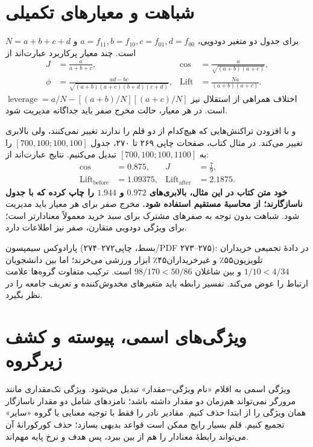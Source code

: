 \documentclass[12pt,a4paper,oneside]{report}
\newcounter{ex}[chapter]
\begin{document}
\section{شباهت و معیارهای تکمیلی}

برای جدول دو متغیر دودویی، $a=f_{11},b=f_{10},c=f_{01},d=f_{00}$ و $N=a+b+c+d$ است. چند معیار پرکاربرد عبارت‌اند از
\begin{align*}
J&=\frac a{a+b+c},&\operatorname{cos}&=\frac a{\sqrt{(a+b)(a+c)}},\\
\phi&=\frac{ad-bc}{\sqrt{(a+b)(a+c)(b+d)(c+d)}},&\operatorname{Lift}&=\frac{Na}{(a+b)(a+c)}.
\end{align*}
اختلاف همراهی از استقلال نیز $\operatorname{leverage}=a/N-[(a+b)/N][(a+c)/N]$ است. در هر معیار، حالت مخرج صفر باید جداگانه مدیریت شود.

 و  با افزودن تراکنش‌هایی که هیچ‌کدام از دو قلم را ندارند تغییر نمی‌کنند، ولی بالابری تغییر می‌کند. در مثال کتاب، صفحات چاپی ۲۶۹ تا ۲۷۰، جدول $[700,100;100,100]$ را به $[700,100;100,1100]$ تبدیل می‌کنیم. نتایج عبارت‌اند از:
\begin{align*}
\operatorname{cos}&=0.875,& J&=\frac79,\\
\operatorname{Lift}_{\mathrm{before}}&=1.09375,&
\operatorname{Lift}_{\mathrm{after}}&=2.1875.
\end{align*}
\textbf{خود متن کتاب در این مثال، بالابری‌های $0.972$ و $1.944$ را چاپ کرده که با جدول ناسازگارند؛ از محاسبهٔ مستقیم استفاده شود.} مخرج صفر برای هر معیار باید مدیریت شود. شباهت بدون توجه به صفرهای مشترک برای سبد خرید معمولاً معنادارتر است؛ برای ویژگی دودویی متقارن، صفر نیز اطلاعات دارد.

پارادوکس سیمپسون (بسط، چاپی۲۷۲--۲۷۴/PDF ۲۷۳--۲۷۵): در دادهٔ تجمیعی خریداران تلویزیون۵۵٪ و غیرخریداران۴۵٪ ابزار ورزشی می‌خرند؛ اما بین دانشجویان $1/10<4/34$ و بین شاغلان $98/170<50/86$ است. ترکیب متفاوت گروه‌ها علامت ارتباط را عوض می‌کند. تفسیر رابطه باید متغیرهای مخدوش‌کننده و تعریف جامعه را در نظر بگیرد.

\section{ویژگی‌های اسمی، پیوسته و کشف زیرگروه}

ویژگی اسمی به اقلام «نام ویژگی=مقدار» تبدیل می‌شود. ویژگی تک‌مقداری مانند مرورگر نمی‌تواند هم‌زمان دو مقدار داشته باشد؛ نامزدهای شامل دو مقدار ناسازگار همان ویژگی را از ابتدا حذف کنیم. مقادیر نادر را فقط با توجیه معنایی یا گروه «سایر» تجمیع کنیم. قلم بسیار رایج ممکن است قواعد بدیهی بسازد؛ حذف کورکورانهٔ آن می‌تواند رابطهٔ معنادار را هم از بین ببرد، پس هدف و نرخ پایه مهم‌اند.
\end{document}
